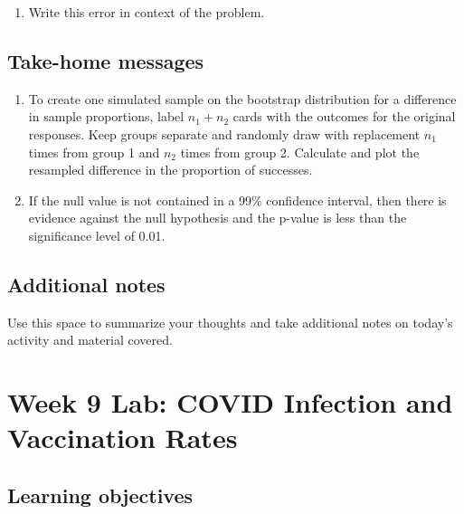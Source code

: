 \documentclass[
]{report}
\providecommand{\tightlist}{%
  \setlength{\itemsep}{0pt}\setlength{\parskip}{0pt}}
\begin{document}
\begin{enumerate}
\def\labelenumi{\arabic{enumi}.}
\setcounter{enumi}{15}
\tightlist
\item
  Write this error in context of the problem.
\end{enumerate}

\vspace{0.5in}

\hypertarget{take-home-messages-15}{%
\subsection{Take-home messages}\label{take-home-messages-15}}

\begin{enumerate}
\def\labelenumi{\arabic{enumi}.}
\item
  To create one simulated sample on the bootstrap distribution for a difference in sample proportions, label \(n_1 + n_2\) cards with the outcomes for the original responses. Keep groups separate and randomly draw with replacement \(n_1\) times from group 1 and \(n_2\) times from group 2. Calculate and plot the resampled difference in the proportion of successes.
\item
  If the null value is not contained in a 99\% confidence interval, then there is evidence against the null hypothesis and the p-value is less than the significance level of 0.01.
\end{enumerate}

\hypertarget{additional-notes-15}{%
\subsection{Additional notes}\label{additional-notes-15}}

Use this space to summarize your thoughts and take additional notes on today's activity and material covered.

\newpage

\hypertarget{week-9-lab-covid-infection-and-vaccination-rates}{%
\section{Week 9 Lab: COVID Infection and Vaccination Rates}\label{week-9-lab-covid-infection-and-vaccination-rates}}


\hypertarget{learning-objectives-14}{%
\subsection{Learning objectives}\label{learning-objectives-14}}
\end{document}
